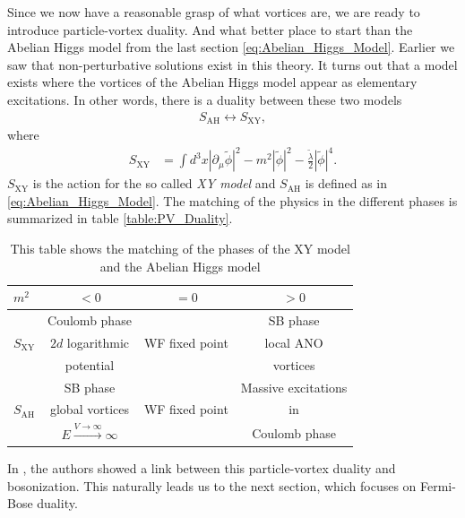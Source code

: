     Since we now have a reasonable grasp of what vortices are, we are ready to introduce particle-vortex duality. And what better place to start than the Abelian Higgs model from the last section \eqref{eq:Abelian_Higgs_Model}. Earlier we saw that non-perturbative solutions exist in this theory. It turns out that a model exists where the vortices of the Abelian Higgs model appear as elementary excitations. In other words, there is a duality between these two models
    \begin{align}
        S_{\text{AH}} \longleftrightarrow S_{\text{XY}},
    \end{align}
    where
    \begin{align}
        S_{\text{XY}} &= \int d^3x |\partial_{\mu}\tilde{\phi}|^2-m^2 |\tilde{\phi}|^2 - \frac{\tilde{\lambda}}{2} |\tilde{\phi}|^4.
    \end{align}
    $S_{\text{XY}}$ is the action for the so called \textit{XY model} and $S_{\text{AH}}$ is defined as in \eqref{eq:Abelian_Higgs_Model}. The matching of the physics in the different phases is summarized in table \eqref{table:PV_Duality}.

    \begin{table}
\begin{center}
  \begin{tabular}{| l | c | c | c|}
      \hline
    $m^2$ & $<0$ & $=0$ & $>0$\\ \hline
     & Coulomb phase &  & SB phase\\ 
    $S_{\text{XY}}$ & $2d$ logarithmic & WF fixed point & local ANO \\ 
     & potential &  & vortices \\ \hline
      & SB phase &  &  Massive excitations\\
    $S_{\text{AH}}$ & global vortices & WF fixed point & in\\
      & $E\xrightarrow{V \rightarrow \infty} \infty$ &  & Coulomb phase \\
    \hline
  \end{tabular}
\end{center}
      \caption{This table shows the matching of the phases of the XY model and the Abelian Higgs model}
        \label{table:PV_Duality}
    \end{table}
In \cite{1606.01893}, the authors showed a link between this particle-vortex duality and bosonization. This naturally leads us to the next section, which focuses on Fermi-Bose duality.


%

